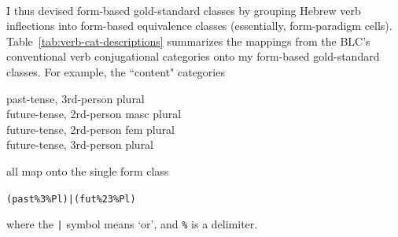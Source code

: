 { \begin{table}[t]
  \centering
 \\
     \label{tab:qal-paradigms}
 \caption{Past and future-tense paradigms for the root \textit{g.m.r} in the \textit{Qal} binyan.}
 \end{table}
I thus devised form-based gold-standard classes by grouping Hebrew verb inflections into form-based equivalence classes (essentially, form-paradigm cells). Table~\ref{tab:verb-cat-descriptions} summarizes the mappings from the BLC's conventional verb conjugational categories onto my form-based gold-standard classes. For example, the ``content" categories
\begin{center}
past-tense, 3rd-person plural \\
future-tense, 2rd-person masc plural \\
future-tense, 2rd-person fem plural \\
future-tense, 3rd-person plural \\
\end{center}
all map onto the single form class
\begin{center}
\texttt{(past\%3\%Pl)|(fut\%23\%Pl)}
\end{center}
where the \texttt{|} symbol means `or', and \texttt{\%} is a delimiter.

}
